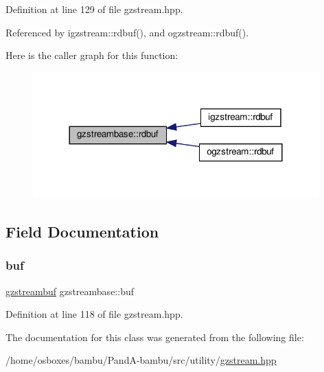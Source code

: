 Definition at line 129 of file gzstream.\+hpp.



Referenced by igzstream\+::rdbuf(), and ogzstream\+::rdbuf().

Here is the caller graph for this function\+:
\nopagebreak
\begin{figure}[H]
\begin{center}
\leavevmode
\includegraphics[width=312pt]{dc/d09/classgzstreambase_a85a5899a56d1ee9259d02083195471ba_icgraph}
\end{center}
\end{figure}


\subsection{Field Documentation}
\mbox{\label{classgzstreambase_a131e2a0d578c43cb4eb34d668bf75fdb}} 
\subsubsection{\texorpdfstring{buf}{buf}}
{\footnotesize\ttfamily \hyperlink{classgzstreambuf}{gzstreambuf} gzstreambase\+::buf\hspace{0.3cm}{\ttfamily [protected]}}



Definition at line 118 of file gzstream.\+hpp.



The documentation for this class was generated from the following file\+:\begin{DoxyCompactItemize}
\item 
/home/osboxes/bambu/\+Pand\+A-\/bambu/src/utility/\hyperlink{gzstream_8hpp}{gzstream.\+hpp}\end{DoxyCompactItemize}
